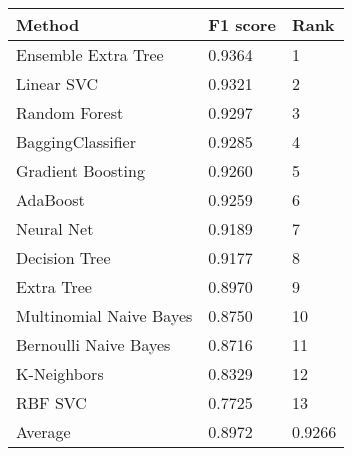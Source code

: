 \begin{tabular}{|l|l|l| }
\hline
Method                  & F1 score & Rank \\ \hline
Ensemble Extra Tree     & 0.9364 & 1\\
Linear SVC              & 0.9321 & 2\\
Random Forest           & 0.9297 & 3\\
BaggingClassifier       & 0.9285 & 4\\
Gradient Boosting       & 0.9260 & 5\\
AdaBoost                & 0.9259 & 6\\
Neural Net              & 0.9189 & 7\\
Decision Tree           & 0.9177 & 8\\
Extra Tree              & 0.8970 & 9\\
Multinomial Naive Bayes & 0.8750 & 10\\
Bernoulli Naive Bayes   & 0.8716 & 11\\
K-Neighbors             & 0.8329 & 12\\
RBF SVC                 & 0.7725 & 13\\
Average & 0.8972 & 0.9266 & \\
\hline
\end{tabular}